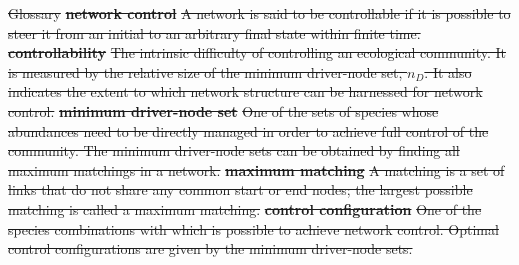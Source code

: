 \documentclass[a4paper]{artikel1}
\theoremstyle{definition}
\theoremstyle{definition}
\theoremstyle{definition}
\theoremstyle{remark}
\providecommand{\DIFdeltex}[1]{{\protect\color{red}\sout{#1}}}                      %
\providecommand{\DIFdelbegin}{} %
\providecommand{\DIFdelFL}[1]{\DIFdel{#1}} %
\providecommand{\DIFdel}[1]{\texorpdfstring{\DIFdeltex{#1}}{}} %
\begin{document}
\DIFdelbegin %

{%
\DIFdelFL{Glossary}}
\textbf{\DIFdelFL{network control}} %
\DIFdelFL{\hspace{1em}A network is said to be controllable if it is possible to steer it from an initial to an arbitrary final state within finite time. }%
\textbf{\DIFdelFL{controllability}} %
\DIFdelFL{\hspace{1em}The intrinsic difficulty of controlling an ecological community. It is measured by the relative size of the minimum driver-node set, $n_D$. It also indicates the extent to which network structure can be harnessed for network control. }%
\textbf{\DIFdelFL{minimum driver-node set}} %
\DIFdelFL{\hspace{1em}One of the sets of species whose abundances need to be directly managed in order to achieve full control of the community. The minimum driver-node sets can be obtained by finding all maximum matchings in a network. }%
\textbf{\DIFdelFL{maximum matching}} %
\DIFdelFL{\hspace{1em}A matching is a set of links that do not share any common start or end nodes; the largest possible matching is called a maximum matching. }%
\textbf{\DIFdelFL{control configuration}} %
\DIFdelFL{\hspace{1em}One of the species combinations with which is possible to achieve network control. Optimal control configurations are given by the minimum driver-node sets. }%
\end{document}
